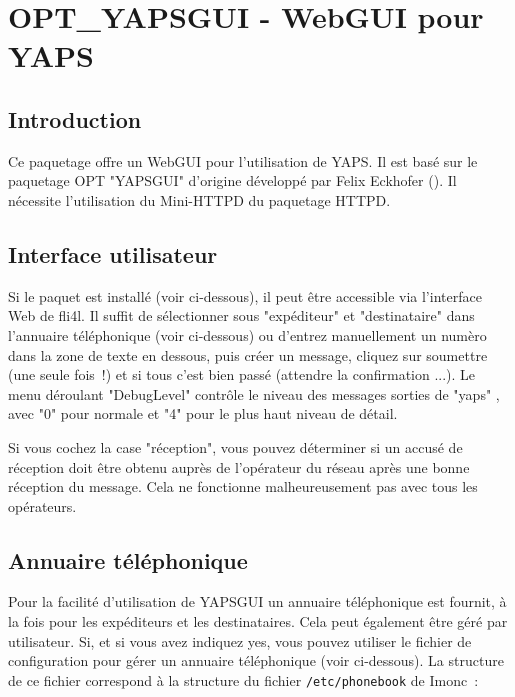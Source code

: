 \section {OPT\_YAPSGUI - WebGUI pour YAPS}

\subsection {Introduction}

Ce paquetage offre un WebGUI pour l'utilisation de YAPS. Il est basé sur
le paquetage OPT "YAPSGUI" d'origine développé par Felix Eckhofer
(). Il nécessite l'utilisation du Mini-HTTPD du paquetage
HTTPD.

\subsection {Interface utilisateur}

Si le paquet est installé (voir ci-dessous), il peut être accessible via
l'interface Web de fli4l. Il suffit de sélectionner sous "expéditeur" et
"destinataire" dans l'annuaire téléphonique (voir ci-dessous) ou d'entrez
manuellement un numèro dans la zone de texte en dessous, puis créer un message,
cliquez sur soumettre (une seule fois~!) et si tous c'est bien passé (attendre
la confirmation ...). Le menu déroulant "DebugLevel" contrôle le niveau des
messages sorties de "yaps" , avec "0" pour normale et "4" pour le plus haut
niveau de détail.

Si vous cochez la case "réception", vous pouvez déterminer si un accusé de
réception doit être obtenu auprès de l'opérateur du réseau après une bonne
réception du message. Cela ne fonctionne malheureusement pas avec tous
les opérateurs.

\subsection {Annuaire téléphonique}

Pour la facilité d'utilisation de YAPSGUI un annuaire téléphonique est fournit,
à la fois pour les expéditeurs et les destinataires. Cela peut également être géré
par utilisateur. Si, et si vous avez indiquez yes, vous pouvez utiliser le fichier
de configuration pour gérer un annuaire téléphonique (voir ci-dessous). La structure
de ce fichier correspond à la structure du fichier \texttt{/etc/phonebook} de Imonc~:

